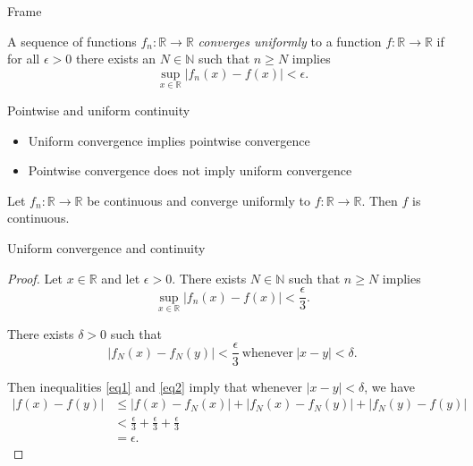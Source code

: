\documentclass{beamer}		%
\begin{document}
\begin{frame}{Frame}
\begin{definition}	%

A sequence of functions $f_n \colon \mathbb{R} \to \mathbb{R}$ \emph{converges uniformly} to a function $f \colon \mathbb{R} \to \mathbb{R}$ if for all $\epsilon > 0$ there exists an $N \in \mathbb{N}$ such that $n \geq N$ implies 
\[
\sup_{x \in \mathbb{R}} |f_n(x) - f(x)| < \epsilon.
\]

\end{definition}

\pause	%

\begin{block}{Pointwise and uniform continuity} %

\begin{itemize}
\item Uniform convergence implies pointwise convergence
\item Pointwise convergence does not imply uniform convergence
\end{itemize}

\end{block}

\pause

\begin{theorem}
Let $f_n \colon\mathbb{R} \to \mathbb{R}$ be continuous and converge uniformly to $f \colon \mathbb{R} \to \mathbb{R}$.  Then $f$ is continuous.
\end{theorem}

\end{frame}

\begin{frame}{Uniform convergence and continuity}

\begin{proof}
Let $x \in \mathbb{R}$ and let $\epsilon > 0$.  There exists $N \in \mathbb{N}$ such that $n \geq N$ implies
\begin{equation}
\label{eq1}
\sup_{x \in \mathbb{R}} |f_n(x) - f(x)| < \frac{\epsilon}{3}.
\end{equation}

There exists $\delta > 0$ such that 
\begin{equation}
\label{eq2}
|f_N(x) - f_N(y) | < \frac{\epsilon}{3}\ \mbox{whenever}\ |x-y| < \delta.
\end{equation}

Then inequalities \eqref{eq1} and \eqref{eq2} imply that whenever $|x-y | < \delta$, we have 
\begin{align*}
|f(x) - f(y)| 
& \leq |f(x) - f_N(x)| + |f_N(x) - f_N(y)| + | f_N(y) - f(y) | \\
& < \frac{\epsilon}{3} + \frac{\epsilon}{3} + \frac{\epsilon}{3} \\
& = \epsilon.
\end{align*} 
\end{proof}

\end{frame}
\end{document}
